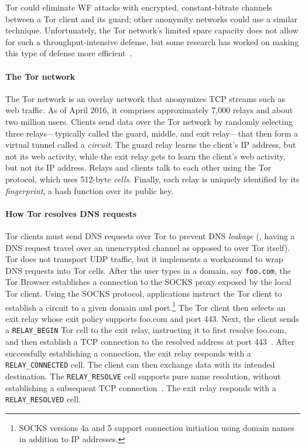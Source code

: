 Tor could eliminate WF
attacks with encrypted, constant-bitrate channels between a Tor client and
its guard; other anonymity networks could use a similar technique.
Unfortunately, the Tor network's limited spare capacity does not
allow for such a throughput-intensive defense, but some research has
worked on making this type of defense
more efficient~\cite{Cai2014a,DBLP:journals/corr/JuarezIPDW15,WangThesis}.

\paragraph{The Tor network}
The Tor network is an overlay network that anonymizes TCP streams such as web
traffic.  As of April 2016, it comprises approximately 7,000 relays and about two
million users.  Clients send data over the Tor network by randomly selecting
three relays---typically called the guard, middle, and exit relay---that then
form a virtual tunnel called a \emph{circuit}.  The guard relay learns the
client's IP address, but not its web activity, while the exit relay gets to
learn the client's web activity, but not its IP address.  Relays and clients
talk to each other using the Tor protocol, which uses 512-byte \emph{cells}.
Finally, each relay is uniquely identified by its \emph{fingerprint}, a hash
function over its public key.

\paragraph{How Tor resolves DNS requests}
Tor clients must send DNS requests over Tor to prevent DNS {\em leakage}
(\ie, having a
DNS request travel over an unencrypted channel as opposed to over Tor
itself).  Tor does not transport UDP
traffic, but it implements a workaround to wrap DNS requests into Tor cells.
After the user types in a domain, say {\tt foo.com}, the Tor Browser establishes a
connection to the SOCKS proxy exposed by the local Tor client.  Using the SOCKS
protocol, applications instruct the Tor client to establish a circuit to a given
domain and port.\footnote{SOCKS versions 4a and 5 support connection
initiation using domain names in addition to IP addresses.} The Tor client then
selects an exit relay whose exit policy supports foo.com and port 443.  Next,
the client sends a \texttt{RELAY\_BEGIN} Tor cell to the exit relay, instructing
it to first resolve foo.com, and then establish a TCP connection to the resolved
address at port 443~\cite[\S~6.2]{tor-spec}.  After successfully establishing a
connection, the exit relay responds with a \texttt{RELAY\_CONNECTED}
cell.  The client can then exchange data with its intended
destination.  The \texttt{RELAY\_RESOLVE} cell supports pure name resolution,
without establishing a subsequent TCP connection~\cite[\S~6.4]{tor-spec}.  The
exit relay responds with a \texttt{RELAY\_RESOLVED} cell.


